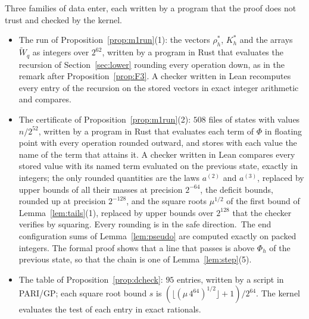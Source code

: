\documentclass[11pt]{amsart}
\theoremstyle{definition}
\numberwithin{equation}{section}
\newcommand{\computed}[1]{\ignorespaces}
\begin{document}
Three families of data enter, each written by a program that the proof does not trust and checked by the kernel.
\begin{itemize}
\item The run of Proposition~\ref{prop:m1run}(1): the vectors $\rho^*_h$, $K^*_h$ and the arrays $\widetilde W_q$ as integers over $2^{62}$, written by a program in Rust that evaluates the recursion of Section~\ref{sec:lower} rounding every operation down, as in the remark after Proposition~\ref{prop:F3}. A checker written in Lean recomputes every entry of the recursion on the stored vectors in exact integer arithmetic and compares.\computed{code/m1run/src/bin/m1run.rs, code/m1run/run.sh, code/m1gen/Gen/Main.lean, code/m1gen/gen.sh, .github/workflows/ci.yml}
\item The certificate of Proposition~\ref{prop:m1run}(2): $508$ files of states with values $n/2^{52}$, written by a program in Rust that evaluates each term of $\Phi$ in floating point with every operation rounded outward, and stores with each value the name of the term that attains it. A checker written in Lean compares every stored value with its named term evaluated on the previous state, exactly in integers; the only rounded quantities are the laws $a^{(2)}$ and $a^{(3)}$, replaced by upper bounds of all their masses at precision $2^{-64}$, the deficit bounds, rounded up at precision $2^{-128}$, and the square roots $\mu^{1/2}$ of the first bound of Lemma~\ref{lem:tails}(1), replaced by upper bounds over $2^{128}$ that the checker verifies by squaring. Every rounding is in the safe direction.\computed{FrogModel/D3/LaneD/K/SLaws.lean, FrogModel/D3/LaneD/K/Check.lean}\ The end configuration sums of Lemma~\ref{lem:pseudo} are computed exactly on packed integers. The formal proof shows that a line that passes is above $\Phi_h$ of the previous state, so that the chain is one of Lemma~\ref{lem:step}(5).\computed{code/d3cert/cert/src/main.rs, code/d3cert/fhat/src/main.rs, code/d3cert/run.sh, code/d3cert/out/run.out, code/d3chain/Gen/Main.lean, code/d3chain/gen.sh, code/formal-proof/main_axioms.lean, records/build/release-build.sh, records/build/out/release-build.out}
\item The table of Proposition~\ref{prop:dcheck}: $95$ entries, written by a script in PARI/GP; each square root bound $s$ is $(\lfloor(\mu\,4^{64})^{1/2}\rfloor+1)/2^{64}$. The kernel evaluates the test of each entry in exact rationals.\computed{code/dcheck/dbranch_m1.gp, code/dcheck/dcheck_m1_cert.gp, code/dcheck/gen_table.gp, .github/workflows/ci.yml}
\end{itemize}
\end{document}
